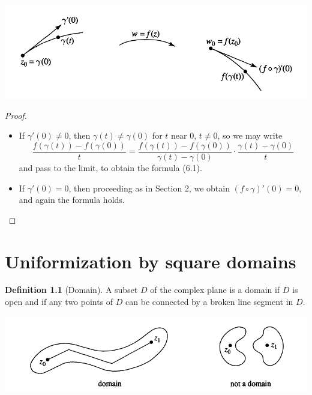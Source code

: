 \documentclass[
]{book}
\providecommand{\tightlist}{%
  \setlength{\itemsep}{0pt}\setlength{\parskip}{0pt}}
\theoremstyle{definition}
\newtheorem{definition}{Definition}[chapter]
\theoremstyle{definition}
\theoremstyle{definition}
\theoremstyle{definition}
\theoremstyle{remark}
\begin{document}
\includegraphics[width=13in]{figures/Confromal_mapping/fig2}

\begin{proof}
\leavevmode

\begin{itemize}
\tightlist
\item
  If \(\gamma'(0) \neq 0\), then \(\gamma(t) \neq \gamma(0)\) for \(t\) near \(0\), \(t \neq 0\), so we may write
  \begin{equation}
  \frac{f(\gamma(t)) - f(\gamma(0))}{t} = \frac{f(\gamma(t)) - f(\gamma(0))}{\gamma(t) - \gamma(0)} \cdot \frac{\gamma(t) - \gamma(0)}{t}
  \end{equation}
  and pass to the limit, to obtain the formula (6.1).
\item
  If \(\gamma'(0) = 0\), then proceeding as in Section 2, we obtain \((f \circ \gamma)'(0) = 0\), and again the formula holds.
\end{itemize}

\end{proof}

\chapter{Uniformization by square domains}\label{uniformization-by-square-domains}

\begin{definition}[Domain]
\protect\hypertarget{def:unnamed-chunk-23}{}\label{def:unnamed-chunk-23}A subset \(D\) of the complex plane is a domain if \(D\) is open and if any two points of \(D\) can be connected by a broken line segment in \(D\).
\end{definition}

\includegraphics[width=12.58in]{figures/Mario_Bonk/fig1}
\end{document}

